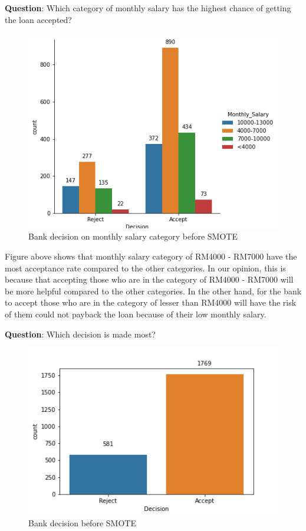 \documentclass[11pt]{article}
\begin{document}
\noindent \textbf{Question}: Which category of monthly salary has the highest chance of getting the loan accepted?
\begin{figure}[h]
\centerline{\includegraphics[scale=0.8]{bSMOTE_dcs_month_salary.png} }
\label{fig:bSmoteDCSmonthsalary}
\caption{Bank decision on monthly salary category before SMOTE}
\end{figure}

Figure above shows that monthly salary category of RM4000 - RM7000 have the most acceptance rate compared to the other categories. In our opinion, this is because that accepting those who are in the category of RM4000 - RM7000 will be more helpful compared to the other categories. In the other hand, for the bank to accept those who are in the category of lesser than RM4000 will have the risk of them could not payback the loan because of their low monthly salary.
\clearpage

\noindent \textbf{Question}: Which decision is made most?
\begin{figure}[h]
\centerline{\includegraphics[scale=0.8]{bSMOTE_dcs_bank.png} }
\label{fig:bSmoteDCSbank}
\caption{Bank decision before SMOTE}
\end{figure}
\end{document}
